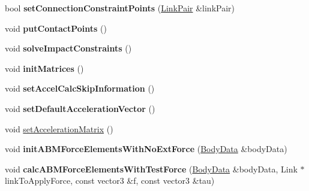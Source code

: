 \begin{DoxyCompactItemize}
\item 
\hypertarget{classOpenHRP_1_1CFSImpl_ab4cb4a004e5100050579b1185c1aa2c7}{bool {\bfseries set\-Connection\-Constraint\-Points} (\hyperlink{structOpenHRP_1_1CFSImpl_1_1LinkPair}{Link\-Pair} \&link\-Pair)}\label{classOpenHRP_1_1CFSImpl_ab4cb4a004e5100050579b1185c1aa2c7}

\item 
\hypertarget{classOpenHRP_1_1CFSImpl_a3eb9ee041d20588f2048b53742288e16}{void {\bfseries put\-Contact\-Points} ()}\label{classOpenHRP_1_1CFSImpl_a3eb9ee041d20588f2048b53742288e16}

\item 
\hypertarget{classOpenHRP_1_1CFSImpl_a04724f09372ba0a1009928a6bd8999a0}{void {\bfseries solve\-Impact\-Constraints} ()}\label{classOpenHRP_1_1CFSImpl_a04724f09372ba0a1009928a6bd8999a0}

\item 
\hypertarget{classOpenHRP_1_1CFSImpl_a62ef21510d8017ca5017b6680bd2539f}{void {\bfseries init\-Matrices} ()}\label{classOpenHRP_1_1CFSImpl_a62ef21510d8017ca5017b6680bd2539f}

\item 
\hypertarget{classOpenHRP_1_1CFSImpl_a01d717e13f4c2d9d42889ac71fc48904}{void {\bfseries set\-Accel\-Calc\-Skip\-Information} ()}\label{classOpenHRP_1_1CFSImpl_a01d717e13f4c2d9d42889ac71fc48904}

\item 
\hypertarget{classOpenHRP_1_1CFSImpl_a55be14a72af6208678997dddc5fae98c}{void {\bfseries set\-Default\-Acceleration\-Vector} ()}\label{classOpenHRP_1_1CFSImpl_a55be14a72af6208678997dddc5fae98c}

\item 
void \hyperlink{classOpenHRP_1_1CFSImpl_aa85768ddd80a84f7ab6f038ef21e1869}{set\-Acceleration\-Matrix} ()
\item 
\hypertarget{classOpenHRP_1_1CFSImpl_a7fbbbdcf550aa41db3b879a547a8a784}{void {\bfseries init\-A\-B\-M\-Force\-Elements\-With\-No\-Ext\-Force} (\hyperlink{structOpenHRP_1_1CFSImpl_1_1BodyData}{Body\-Data} \&body\-Data)}\label{classOpenHRP_1_1CFSImpl_a7fbbbdcf550aa41db3b879a547a8a784}

\item 
\hypertarget{classOpenHRP_1_1CFSImpl_abe259d7ced654a87e2e4a781a0df1bf7}{void {\bfseries calc\-A\-B\-M\-Force\-Elements\-With\-Test\-Force} (\hyperlink{structOpenHRP_1_1CFSImpl_1_1BodyData}{Body\-Data} \&body\-Data, Link $\ast$link\-To\-Apply\-Force, const vector3 \&f, const vector3 \&tau)}\label{classOpenHRP_1_1CFSImpl_abe259d7ced654a87e2e4a781a0df1bf7}


\end{DoxyCompactItemize}
